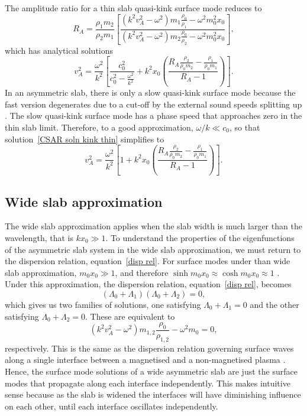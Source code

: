 \documentclass[namedreferences]{solarphysics}
\numberwithin{equation}{section}
\begin{document}
\begin{article}
The amplitude ratio for a thin slab quasi-kink surface mode reduces to
\begin{equation}
R_A = \frac{\rho_1m_2}{\rho_2m_1}\left[\frac{(k^2v_A^2-\omega^2)m_1\frac{\rho_0}{\rho_1}-\omega^2m_0^2x_0}{(k^2v_A^2-\omega^2)m_2\frac{\rho_0}{\rho_2}-\omega^2m_0^2x_0}\right], 
\end{equation}
which has analytical solutions
\begin{equation}
v_A^2 = \frac{\omega^2}{k^2} \left[\frac{c_0^2}{c_0^2 - \frac{\omega^2}{k^2}} + k^2x_0\left(\frac{R_A\frac{\rho_2}{\rho_0m_2} - \frac{\rho_1}{\rho_0m_1}}{R_A - 1}\right)\right]. \label{CSAR soln kink thin}
\end{equation}
In an asymmetric slab, there is only a slow quasi-kink surface mode because the fast version degenerates due to a cut-off by the external sound speeds splitting up \citep{all_etal17}. The slow quasi-kink surface mode has a phase speed that approaches zero in the thin slab limit. Therefore, to a good approximation, $\omega/k \ll c_0$, so that solution~\eqref{CSAR soln kink thin} simplifies to
\begin{equation}
v_A^2 = \frac{\omega^2}{k^2} \left[1 + k^2x_0\left(\frac{R_A\frac{\rho_2}{\rho_0m_2} - \frac{\rho_1}{\rho_0m_1}}{R_A - 1}\right)\right]. \label{CSAR soln kink thin simplified}
\end{equation}

\subsection{Wide slab approximation}
The wide slab approximation applies when the slab width is much larger than the wavelength, that is $kx_0 \gg 1$. To understand the properties of the eigenfunctions of the asymmetric slab system in the wide slab approximation, we must return to the dispersion relation, equation~\eqref{disp rel}. For surface modes under than wide slab approximation, $m_0x_0 \gg 1$, and therefore $\sinh{m_0x_0} \approx \cosh{m_0x_0} \approx 1$ \cite{rob81b}. Under this approximation, the dispersion relation, equation~\eqref{disp rel}, becomes
\begin{equation}
(\Lambda_0 + \Lambda_1)(\Lambda_0 + \Lambda_2) = 0,
\end{equation}
which gives us two families of solutions, one satisfying $\Lambda_0 + \Lambda_1 = 0$ and the other satisfying $\Lambda_0 + \Lambda_2 = 0$. These are equivalent to
\begin{equation}
(k^2v_A^2 - \omega^2)m_{1,2}\frac{\rho_0}{\rho_{1,2}} - \omega^2m_0 = 0,
\end{equation}
respectively. This is the same as the dispersion relation governing surface waves along a single interface between a magnetised and a non-magnetised plasma \cite{rob81a}. Hence, the surface mode solutions of a wide asymmetric slab are just the surface modes that propagate along each interface independently. This makes intuitive sense because as the slab is widened the interfaces will have diminishing influence on each other, until each interface oscillates independently.


\end{article}
\end{document}
